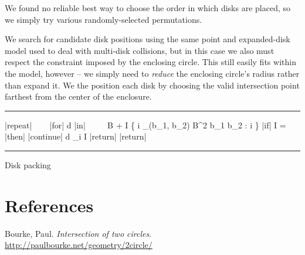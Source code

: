 \documentclass{article}
\begin{document}
We found no reliable best way to choose the order in which
disks are placed, so we simply try various randomly-selected
permutations.

We search for candidate disk positions using the same
point and expanded-disk model used to deal with multi-disk
collisions, but in this case we also must respect the
constraint imposed by the enclosing circle.
This still easily fits within the model, however --
we simply need to {\it reduce} the enclosing circle's
radius rather than expand it.
We the position each disk by choosing the valid intersection
point farthest from the center of the enclosure.

\begin{algorithm}
\hrule\vspace{10pt}
\begin{program}
|repeat|  \; 
~~~\tab%
|for| \;  \; d \; |in| \; 
~~~~\tab%
  B \; \leftarrow \; 
           +  \untab
  I \leftarrow \{ i \in \cup_{(b_1, b_2) \in B^2} \; b_1 \cap b_2 : i \;  \}
  |if| \; I = \phi \; |then| \; |continue|
  d \leftarrow \arg\max_{i \in I} 
\untab
|return| \; 
\untab
|return| \; \bot
\end{program}
\hrule
\caption{Disk packing}
\label{alg:pack}
\end{algorithm}

\section{References}

Bourke, Paul. \textit{Intersection of two circles}.
\url{http://paulbourke.net/geometry/2circle/}
\end{document}
